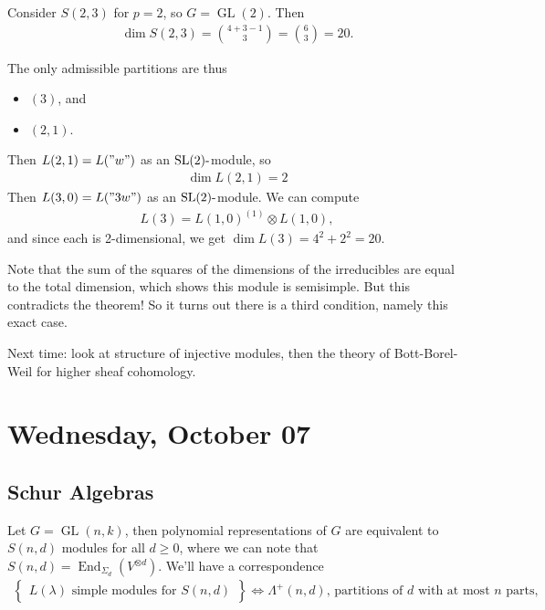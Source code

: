 \begin{example}

Consider \(S(2, 3)\) for \(p=2\), so \(G = \operatorname{GL}(2)\). Then
\begin{align*}  
\dim S(2, 3) = {4+3-1 \choose 3} = {6\choose 3} = 20
.\end{align*}

The only admissible partitions are thus

\begin{itemize}
\tightlist
\item
  \((3)\), and
\item
  \((2, 1)\).
\end{itemize}

Then \(L(2, 1) = L("w")\) as an
\({\operatorname{SL}}(2){\hbox{-}}\)module, so
\begin{align*}
\dim L(2, 1) = 2
\end{align*}
Then \(L(3, 0) = L("3w")\) as an
\({\operatorname{SL}}(2){\hbox{-}}\)module. We can compute
\begin{align*}  
L(3) = L(1, 0)^{(1)} \otimes L(1, 0)
,\end{align*}
and since each is 2-dimensional, we get \(\dim L(3) = 4^2 + 2^2 = 20\).

Note that the sum of the squares of the dimensions of the irreducibles
are equal to the total dimension, which shows this module is semisimple.
But this contradicts the theorem! So it turns out there is a third
condition, namely this exact case.

\end{example}

Next time: look at structure of injective modules, then the theory of
Bott-Borel-Weil for higher sheaf cohomology.

\hypertarget{wednesday-october-07}{%
\section{Wednesday, October 07}\label{wednesday-october-07}}

\hypertarget{schur-algebras}{%
\subsection{Schur Algebras}\label{schur-algebras}}

Let \(G = \operatorname{GL}(n, k)\), then polynomial representations of
\(G\) are equivalent to \(S(n, d)\) modules for all \(d\geq 0\), where
we can note that
\(S(n, d) = \operatorname{End}_{\Sigma_d}(V^{\otimes d})\). We'll have a
correspondence
\begin{align*}  
\left\{{\substack{L(\lambda) \text{ simple modules for } S(n,d)}}\right\}
\iff
\Lambda^+(n, d) \text{, partitions of $d$ with at most $n$ parts}
,\end{align*}

